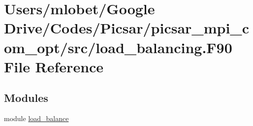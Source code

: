\hypertarget{load__balancing_8_f90}{}\section{Users/mlobet/\+Google Drive/\+Codes/\+Picsar/picsar\+\_\+mpi\+\_\+com\+\_\+opt/src/load\+\_\+balancing.F90 File Reference}
\label{load__balancing_8_f90}
\subsection*{Modules}
\begin{DoxyCompactItemize}
\item 
module \hyperlink{namespaceload__balance}{load\+\_\+balance}
\end{DoxyCompactItemize}
